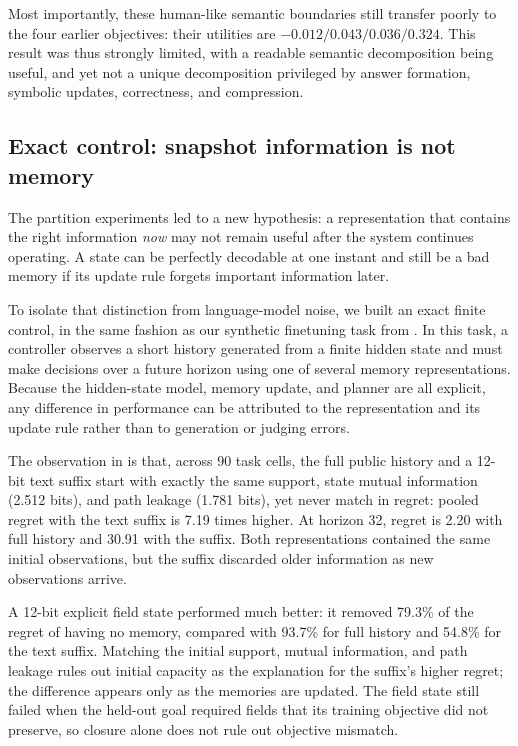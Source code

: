 Most importantly, these human-like semantic boundaries still transfer poorly to the four earlier objectives: their utilities are $-0.012/0.043/0.036/0.324$. This result was thus strongly limited, with a readable semantic decomposition being useful, and yet not a unique decomposition privileged by answer formation, symbolic updates, correctness, and compression.

\subsection{Exact control: snapshot information is not memory}

The partition experiments led to a new hypothesis: a representation that contains the right information \emph{now} may not remain useful after the system continues operating. A state can be perfectly decodable at one instant and still be a bad memory if its update rule forgets important information later.

To isolate that distinction from language-model noise, we built an exact finite control, in the same fashion as our synthetic finetuning task from . In this task, a controller observes a short history generated from a finite hidden state and must make decisions over a future horizon using one of several memory representations. Because the hidden-state model, memory update, and planner are all explicit, any difference in performance can be attributed to the representation and its update rule rather than to generation or judging errors.

The observation in  is that, across 90 task cells, the full public history and a 12-bit text suffix start with exactly the same support, state mutual information (2.512 bits), and path leakage (1.781 bits), yet never match in regret: pooled regret with the text suffix is 7.19 times higher. At horizon 32, regret is 2.20 with full history and 30.91 with the suffix. Both representations contained the same initial observations, but the suffix discarded older information as new observations arrive.

A 12-bit explicit field state performed much better: it removed 79.3\% of the regret of having no memory, compared with 93.7\% for full history and 54.8\% for the text suffix. Matching the initial support, mutual information, and path leakage rules out initial capacity as the explanation for the suffix's higher regret; the difference appears only as the memories are updated. The field state still failed when the held-out goal required fields that its training objective did not preserve, so closure alone does not rule out objective mismatch.

